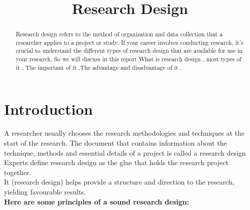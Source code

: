 \documentclass[conference]{IEEEtran}
\title{\textbf{Research Design \\}}
\begin{document}
	
	\author{

	
		
	}


	\maketitle
\begin{abstract}
	\label{Section abstract}
	
Research design refers to the method of organization and data collection that a researcher applies to a project or study. If your career involves conducting research, it's crucial to understand the different types of research design that are available for use in your research, So we will discuss in this report What is research design , most  types of it  , The important of it ,The advantage and disadvantage of it .

	
\end{abstract}




\section{\textbf{Introduction}}
\label{section introduction}
A researcher usually chooses the research methodologies and techniques at the start of the research. The document that contains information about the technique, methods and essential details of a project is called a research design\\
Experts define research design as the glue that holds the research project together.\\
It (research design) helps provide a structure and direction to the research, yielding favourable results.\\
 \textbf{Here are some principles of a sound research design:}
\end{document}
